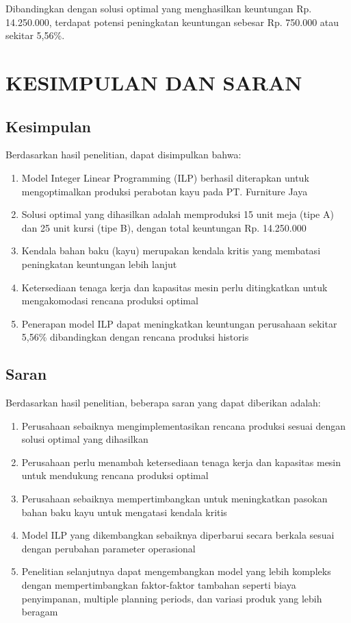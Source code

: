 \documentclass[twocolumn]{article}
\begin{document}
Dibandingkan dengan solusi optimal yang menghasilkan keuntungan Rp. 14.250.000, terdapat potensi peningkatan keuntungan sebesar Rp. 750.000 atau sekitar 5,56\%.

\section{KESIMPULAN DAN SARAN}
\subsection{Kesimpulan}
Berdasarkan hasil penelitian, dapat disimpulkan bahwa:
\begin{enumerate}
    \item Model Integer Linear Programming (ILP) berhasil diterapkan untuk mengoptimalkan produksi perabotan kayu pada PT. Furniture Jaya
    \item Solusi optimal yang dihasilkan adalah memproduksi 15 unit meja (tipe A) dan 25 unit kursi (tipe B), dengan total keuntungan Rp. 14.250.000
    \item Kendala bahan baku (kayu) merupakan kendala kritis yang membatasi peningkatan keuntungan lebih lanjut
    \item Ketersediaan tenaga kerja dan kapasitas mesin perlu ditingkatkan untuk mengakomodasi rencana produksi optimal
    \item Penerapan model ILP dapat meningkatkan keuntungan perusahaan sekitar 5,56\% dibandingkan dengan rencana produksi historis
\end{enumerate}

\subsection{Saran}
Berdasarkan hasil penelitian, beberapa saran yang dapat diberikan adalah:
\begin{enumerate}
    \item Perusahaan sebaiknya mengimplementasikan rencana produksi sesuai dengan solusi optimal yang dihasilkan
    \item Perusahaan perlu menambah ketersediaan tenaga kerja dan kapasitas mesin untuk mendukung rencana produksi optimal
    \item Perusahaan sebaiknya mempertimbangkan untuk meningkatkan pasokan bahan baku kayu untuk mengatasi kendala kritis
    \item Model ILP yang dikembangkan sebaiknya diperbarui secara berkala sesuai dengan perubahan parameter operasional
    \item Penelitian selanjutnya dapat mengembangkan model yang lebih kompleks dengan mempertimbangkan faktor-faktor tambahan seperti biaya penyimpanan, multiple planning periods, dan variasi produk yang lebih beragam
\end{enumerate}
\end{document}
